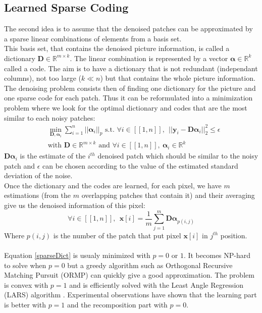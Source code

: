 \documentclass{ipol}
\newcommand{\psize}{m}
\newcommand{\dsize}{k}
\newcommand{\dict}{\textbf{D}}
\newcommand{\code}{\bm{\alpha}}
\newcommand{\pnorm}{p}
\newcommand{\denoi}{\textbf{x}}
\newcommand{\noi}{\textbf{y}}
\newcommand{\RR}{\mathbb{R}}
\begin{document}
\subsection{ Learned Sparse Coding}

The second idea is to assume that the denoised patches can be approximated by a sparse linear combinations of elements from a basis set.\\
This basis set, that contains the denoised picture information, is called a dictionary $\dict \in \RR^{\psize \times \dsize}$. The linear combination is represented by a vector $\code \in \RR^{\dsize}$ called a code.
The aim is to have a dictionary that is not redundant (independant columns), not too large ($\dsize \ll n$) but that contains the whole picture information.\\
The denoising problem consists then of finding one dictionary for the picture and one sparse code for each patch. Thus it can be reformulated into a minimization problem where we look for the optimal dictionary and codes that are the most similar to each noisy patches:
\begin{equation}
\begin{split}
	& \min_{\dict, \code_i} \sum_{i=1}^{n} ||\code_i||_\pnorm \text{ s.t. } \forall i \in [\![1,n]\!],\ \ ||\noi_i  - \dict \code_i||^2_2 \leqslant \epsilon \\
	& \text{with } \dict \in \RR^{\psize \times \dsize} \text{ and } \forall i \in [\![1,n]\!], \ \code_i \in \RR^\dsize
	\label{sparseDict}
\end{split}
\end{equation}
$\dict \code_i$ is the estimate of the $i^{th}$ denoised patch which should be similar to the noisy patch and $\epsilon$ can be chosen according to the value of the estimated standard deviation of the noise.\\
Once the dictionary and the codes are learned, for each pixel, we have $\psize$ estimations (from the $\psize$ overlapping patches that contain it) and their averaging give us the denoised information of this pixel:
\begin{equation}
	\forall i \in [\![1,n]\!], \ \ \denoi[i] = \frac{1}{\psize} \sum_{j=1}^\psize \dict \code_{p(i,j)}
\end{equation}
Where $p(i,j)$ is the number of the patch that put pixel $\denoi[i]$ in $j^{th}$ position.\\
\\
Equation \eqref{sparseDict} is usualy minimized with $\pnorm = 0$ or $1$. It becomes NP-hard to solve when $\pnorm=0$ but a greedy algorithm such as Orthogonal Recursive Matching Pursuit (ORMP) \cite{OMP} can quickly give a good approximation. The problem is convex with $\pnorm=1$ and is efficiently solved with the Least Angle Regression (LARS) algorithm \cite{LARS}. Experimental observations \cite{l0l1} have shown that the learning part is better with $\pnorm=1$ and the recomposition part with $\pnorm=0$.\\
\end{document}
